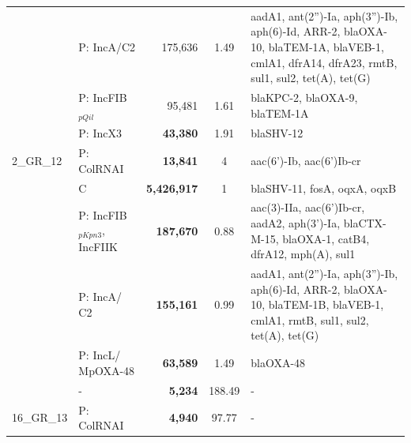 \begin{landscape}
\begin{table}[!ht]
\begin{tabular}{llrcp{12cm}}
\rowcolor{Gray}
 \cellcolor{white}          & P: IncA/C2                  & 175,636      & 1.49     & aadA1, ant(2'')-Ia, aph(3'')-Ib, aph(6)-Id, ARR-2, blaOXA-10, blaTEM-1A, blaVEB-1, cmlA1, dfrA14, dfrA23, rmtB, sul1, sul2, tet(A), tet(G) \\ 
                            & P: IncFIB$_{pQil}$               & 95,481       & 1.61     & blaKPC-2, blaOXA-9, blaTEM-1A                                                                                                              \\
\rowcolor{Gray}
 \cellcolor{white}          & P: IncX3                    & \textbf{43,380}       & 1.91     & blaSHV-12                                                                                                                                  \\
\multirow{-6}{*}{2\_GR\_12}  & P: ColRNAI                  & \textbf{13,841}       & 4        & aac(6')-Ib, aac(6')Ib-cr                                                                                                                   \\ \hline
\rowcolor{Gray}
 \cellcolor{white}  		& C                           & \textbf{5,426,917}     & 1        & blaSHV-11, fosA, oqxA, oqxB                                                                                                                \\
                            & P: IncFIB$_{pKpn3}$, IncFIIK     & \textbf{187,670}      & 0.88     & aac(3)-IIa, aac(6')Ib-cr, aadA2, aph(3')-Ia, blaCTX-M-15, blaOXA-1, catB4, dfrA12, mph(A), sul1                                            \\
\rowcolor{Gray}
 \cellcolor{white}         	& P: IncA/ C2                 & \textbf{155,161}      & 0.99     & aadA1, ant(2'')-Ia, aph(3'')-Ib, aph(6)-Id, ARR-2, blaOXA-10, blaTEM-1B, blaVEB-1, cmlA1, rmtB, sul1, sul2, tet(A), tet(G)                 \\
                            & P: IncL/ MpOXA-48           & \textbf{63,589}       & 1.49     & blaOXA-48                                                                                                                                  \\
\rowcolor{Gray}
 \cellcolor{white}          & -                           & \textbf{5,234}        & 188.49   & -                                                                                                                                          \\
\multirow{-6}{*}{16\_GR\_13}                            & P: ColRNAI                  & \textbf{4,940 }       & 97.77    & -                                                                                                                                          \\ \hline

\end{tabular}
\end{table}
\end{landscape}
